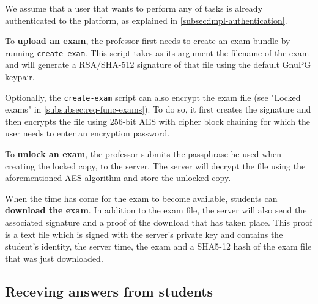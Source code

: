 \documentclass[12pt]{article}
\begin{document}

We assume that a user that wants to perform any of tasks is already authenticated
to the platform, as explained in \autoref{subsec:impl-authentication}.

To \textbf{upload an exam}, the professor first needs to create an exam bundle
by running \texttt{create-exam}. This script takes as its argument the filename
of the exam and will generate a RSA/SHA-512\footnotemark{} signature of that file
using the default GnuPG keypair.


Optionally, the \texttt{create-exam} script can also encrypt the exam file (see
"Locked exams" in \autoref{subsubsec:req-func-exams}). To do so, it first
creates the signature and then encrypts the file using 256-bit AES with cipher
block chaining for which the user needs to enter an encryption password.

To \textbf{unlock an exam}, the professor submits the passphrase he used when
creating the locked copy, to the server. The server will decrypt the file using
the aforementioned AES algorithm and store the unlocked copy.

When the time has come for the exam to become available, students can
\textbf{download the exam}. In addition to the exam file, the server will also
send the associated signature and a proof of the download that has taken place.
This proof is a text file which is signed with the server's private key and
contains the student's identity, the server time, the exam and a SHA5-12 hash
of the exam file that was just downloaded.

\subsection{Receving answers from students}
\label{subsec:impl-answers}

\end{document}
